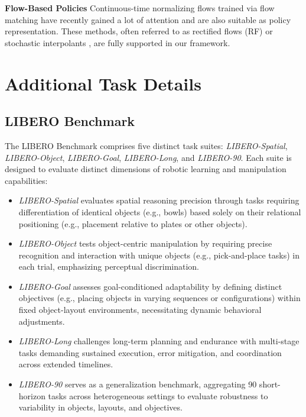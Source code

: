 \textbf{Flow-Based Policies}  
Continuous-time normalizing flows trained via flow matching \cite{lipman2022flow} have recently gained a lot of attention and are also suitable as policy representation. These methods, often referred to as rectified flows (RF) \cite{liu2022flow} or stochastic interpolants \cite{albergo2022building}, are fully supported in our framework.  


\section{Additional Task Details}

\subsection{LIBERO Benchmark}

The LIBERO Benchmark comprises five distinct task suites: \textit{LIBERO-Spatial}, \textit{LIBERO-Object}, \textit{LIBERO-Goal}, \textit{LIBERO-Long}, and \textit{LIBERO-90}. Each suite is designed to evaluate distinct dimensions of robotic learning and manipulation capabilities:

\begin{itemize}
    \item \textit{LIBERO-Spatial} evaluates spatial reasoning precision through tasks requiring differentiation of identical objects (e.g., bowls) based solely on their relational positioning (e.g., placement relative to plates or other objects).
    \item \textit{LIBERO-Object} tests object-centric manipulation by requiring precise recognition and interaction with unique objects (e.g., pick-and-place tasks) in each trial, emphasizing perceptual discrimination.
    \item \textit{LIBERO-Goal} assesses goal-conditioned adaptability by defining distinct objectives (e.g., placing objects in varying sequences or configurations) within fixed object-layout environments, necessitating dynamic behavioral adjustments.
    \item \textit{LIBERO-Long} challenges long-term planning and endurance with multi-stage tasks demanding sustained execution, error mitigation, and coordination across extended timelines.
    \item \textit{LIBERO-90} serves as a generalization benchmark, aggregating 90 short-horizon tasks across heterogeneous settings to evaluate robustness to variability in objects, layouts, and objectives.
\end{itemize}

